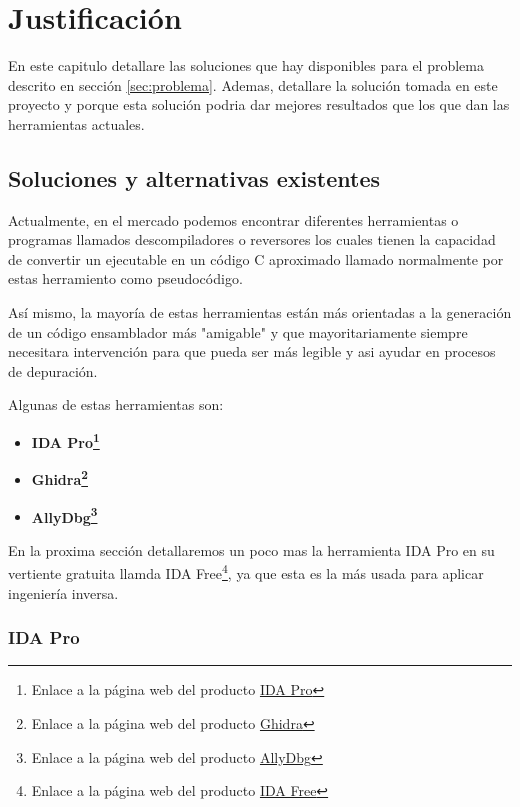 \chapter{Justificación}
\label{cap:justificacion}

En este capitulo detallare las soluciones que hay disponibles para el problema descrito en sección \ref{sec:problema}. Ademas, detallare la solución tomada en este proyecto
y porque esta solución podria dar mejores resultados que los que dan las herramientas actuales.

\section{Soluciones y alternativas existentes}
\label{sec:alternativas}

Actualmente, en el mercado podemos encontrar diferentes herramientas o programas llamados descompiladores o reversores los cuales tienen la capacidad de convertir un ejecutable
en un código C aproximado llamado normalmente por estas herramiento como pseudocódigo.

Así mismo, la mayoría de estas herramientas están más orientadas a la generación de un código ensamblador más "amigable" y que mayoritariamente siempre necesitara intervención
para que pueda ser más legible y asi ayudar en procesos de depuración.

Algunas de estas herramientas son:

\begin{itemize}
    \item \bf IDA Pro\footnote{Enlace a la página web del producto \href{https://hex-rays.com/ida-pro/}{IDA Pro}}
    \item \bf Ghidra\footnote{Enlace a la página web del producto \href{https://ghidra-sre.org/}{Ghidra}}
    \item \bf AllyDbg\footnote{Enlace a la página web del producto \href{https://www.ollydbg.de/}{AllyDbg}}
\end{itemize}

En la proxima sección detallaremos un poco mas la herramienta IDA Pro en su vertiente gratuita llamda IDA Free\footnote{Enlace a la página web del producto \href{https://hex-rays.com/ida-free/}{IDA Free}},
ya que esta es la más usada para aplicar ingeniería inversa.

\subsection{IDA Pro}
\label{subsec:IDA_pro}

